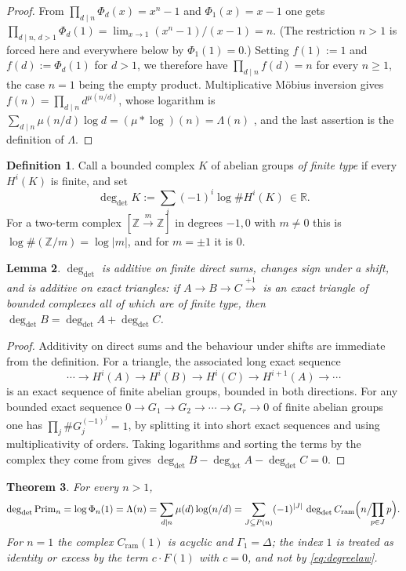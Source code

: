 \documentclass[11pt]{amsart}
\newtheorem{theorem}{Theorem}[section]
\newtheorem{lemma}[theorem]{Lemma}
\theoremstyle{definition}
\newtheorem{definition}[theorem]{Definition}
\theoremstyle{remark}
\newcommand{\R}{\mathbb R}
\newcommand{\Z}{\mathbb Z}
\newcommand{\Prim}{\operatorname{Prim}}
\newcommand{\degdet}{\operatorname{deg}_{\mathrm{det}}}
\begin{document}
\begin{proof}
From $\prod_{d\mid n}\Phi_d(x)=x^n-1$ and $\Phi_1(x)=x-1$ one gets
$\prod_{d\mid n,\,d>1}\Phi_d(1)=\lim_{x\to1}(x^n-1)/(x-1)=n$. (The restriction
$n>1$ is forced here and everywhere below by $\Phi_1(1)=0$.) Setting
$f(1):=1$ and $f(d):=\Phi_d(1)$ for $d>1$, we therefore have
$\prod_{d\mid n}f(d)=n$ for every $n\ge1$, the case $n=1$ being the empty
product. Multiplicative M\"obius inversion gives
$f(n)=\prod_{d\mid n}d^{\mu(n/d)}$, whose logarithm is
$\sum_{d\mid n}\mu(n/d)\log d=(\mu*\log)(n)=\Lambda(n)$ \cite[Ch.~1]{IK}, and the
last assertion is the definition of $\Lambda$.
\end{proof}

\begin{definition}\label{def:degdet}
Call a bounded complex $K$ of abelian groups \emph{of finite type} if every
$H^i(K)$ is finite, and set
\[
  \degdet K:=\sum_i(-1)^i\log\#H^i(K)\ \in\R .
\]
For a two-term complex $[\Z\xrightarrow{m}\Z]$ in degrees $-1,0$ with $m\ne0$
this is $\log\#(\Z/m)=\log|m|$, and for $m=\pm1$ it is $0$.
\end{definition}

\begin{lemma}\label{lem:degdetadd}
$\degdet$ is additive on finite direct sums, changes sign under a shift, and
is additive on exact triangles: if $A\to B\to C\xrightarrow{+1}$ is an exact
triangle of bounded complexes all of which are of finite type, then
$\degdet B=\degdet A+\degdet C$.
\end{lemma}

\begin{proof}
Additivity on direct sums and the behaviour under shifts are immediate from
the definition. For a triangle, the associated long exact sequence
\[
  \cdots\to H^{i}(A)\to H^{i}(B)\to H^{i}(C)\to H^{i+1}(A)\to\cdots
\]
is an exact sequence of finite abelian groups, bounded in both directions.
For any bounded exact sequence $0\to G_1\to G_2\to\cdots\to G_r\to0$ of finite
abelian groups one has $\prod_j\#G_j^{(-1)^j}=1$, by splitting it into short
exact sequences and using multiplicativity of orders. Taking logarithms and
sorting the terms by the complex they come from gives
$\degdet B-\degdet A-\degdet C=0$.
\end{proof}

\begin{theorem}\label{thm:degreelaw}
For every $n>1$,
\begin{equation}\label{eq:degreelaw}
  \degdet\Prim_n=\log\Phi_n(1)=\Lambda(n)=\sum_{d\mid n}\mu(d)\log(n/d)
   =\sum_{J\subseteq P(n)}(-1)^{|J|}\,
     \degdet C_{\mathrm{ram}}\Bigl(n\big/\!\!\prod_{p\in J}p\Bigr).
\end{equation}
For $n=1$ the complex $C_{\mathrm{ram}}(1)$ is acyclic and $\Gamma_1=\Delta$;
the index $1$ is treated as identity or excess by the term $c\cdot F(1)$ with
$c=0$, and not by \eqref{eq:degreelaw}.
\end{theorem}
\end{document}
